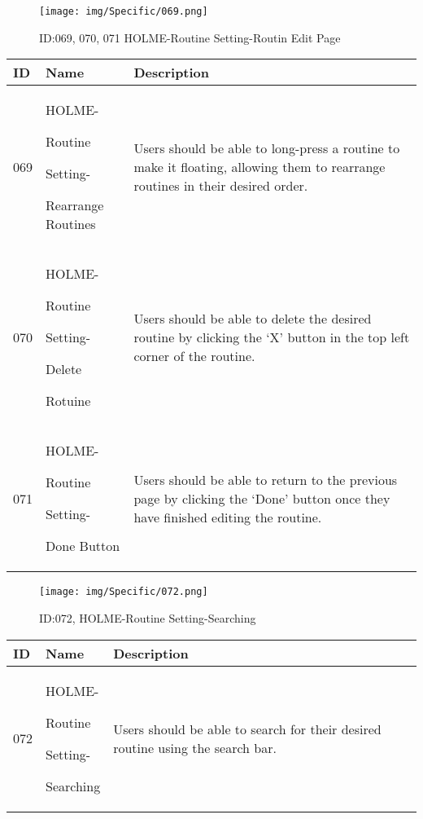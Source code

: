 \documentclass[conference]{IEEEtran}
\begin{document}
\begin{enumerate}
\begin{figure}[h]
\centering
\texttt{[image: img/Specific/069.png]}
\caption{ID:069, 070, 071 HOLME-Routine Setting-Routin Edit Page}
\end{figure}
\begin{table}[h]
\def\arraystretch{1.2} \small
    \begin{tabular}{|p{1cm}|p{1.8cm}|p{5.0cm}|}
        \hline
        ID & Name & Description\\ \hline
         069 \par  & HOLME-\par Routine \par Setting- \par Rearrange Routines & 
Users should be able to long-press a routine to make it floating, allowing them to rearrange routines in their desired order.\\ \hline
         070 \par  & HOLME-\par Routine \par Setting- \par Delete \par Rotuine & 
Users should be able to delete the desired routine by clicking the `X' button in the top left corner of the routine.\\ \hline
	071 \par  & HOLME-\par Routine \par Setting- \par Done Button & 
Users should be able to return to the previous page by clicking the `Done' button once they have finished editing the routine. \\ \hline     
    \end{tabular}
\end{table}
\clearpage

\begin{figure}[h]
\centering
\texttt{[image: img/Specific/072.png]}
\caption{ID:072, HOLME-Routine Setting-Searching}
\end{figure}
\begin{table}[h]
\def\arraystretch{1.2} \small
    \begin{tabular}{|p{1cm}|p{1.8cm}|p{5.0cm}|}
        \hline
        ID & Name & Description\\ \hline
         072 \par  & HOLME-\par Routine \par Setting- \par Searching  & 
Users should be able to search for their desired routine using the search bar. \\ \hline
    \end{tabular}
\end{table}


\end{enumerate}
\end{document}
